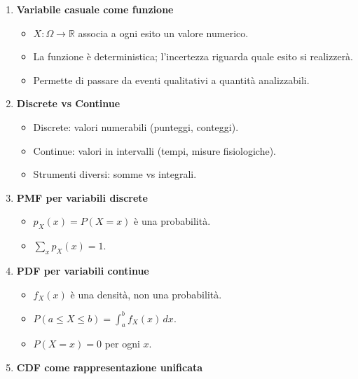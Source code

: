 \documentclass[
  italian,
  letterpaper,
  a4paper,
  11pt,
  open=any]{scrbook}
\providecommand{\tightlist}{%
  \setlength{\itemsep}{0pt}\setlength{\parskip}{0pt}}
\theoremstyle{plain}
\theoremstyle{definition}
\theoremstyle{definition}
\theoremstyle{remark}
\begin{document}
\begin{tcolorbox}[enhanced jigsaw, arc=.35mm, bottomrule=.15mm, bottomtitle=1mm, breakable, colback=white, colbacktitle=quarto-callout-important-color!10!white, colframe=quarto-callout-important-color-frame, coltitle=black, left=2mm, leftrule=.75mm, opacityback=0, opacitybacktitle=0.6, rightrule=.15mm, title=\textcolor{quarto-callout-important-color}{\faExclamation}\hspace{0.5em}{Importante}, titlerule=0mm, toprule=.15mm, toptitle=1mm]

\begin{enumerate}
\def\labelenumi{\arabic{enumi}.}
\tightlist
\item
  \textbf{Variabile casuale come funzione}

  \begin{itemize}
  \tightlist
  \item
    \(X: \Omega \to \mathbb{R}\) associa a ogni esito un valore
    numerico.
  \item
    La funzione è deterministica; l'incertezza riguarda quale esito si
    realizzerà.
  \item
    Permette di passare da eventi qualitativi a quantità analizzabili.
  \end{itemize}
\item
  \textbf{Discrete vs Continue}

  \begin{itemize}
  \tightlist
  \item
    Discrete: valori numerabili (punteggi, conteggi).
  \item
    Continue: valori in intervalli (tempi, misure fisiologiche).
  \item
    Strumenti diversi: somme vs integrali.
  \end{itemize}
\item
  \textbf{PMF per variabili discrete}

  \begin{itemize}
  \tightlist
  \item
    \(p_X(x) = P(X = x)\) è una probabilità.
  \item
    \(\sum_x p_X(x) = 1\).
  \end{itemize}
\item
  \textbf{PDF per variabili continue}

  \begin{itemize}
  \tightlist
  \item
    \(f_X(x)\) è una densità, non una probabilità.
  \item
    \(P(a \leq X \leq b) = \int_a^b f_X(x) \, dx\).
  \item
    \(P(X = x) = 0\) per ogni \(x\).
  \end{itemize}
\item
  \textbf{CDF come rappresentazione unificata}


\end{enumerate}
\end{tcolorbox}
\end{document}
